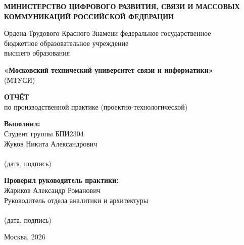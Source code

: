 \documentclass[12pt,a4paper]{report}
\begin{document}
\begin{titlepage}
\begin{center}

\textbf{МИНИСТЕРСТВО ЦИФРОВОГО РАЗВИТИЯ, СВЯЗИ И МАССОВЫХ КОММУНИКАЦИЙ РОССИЙСКОЙ ФЕДЕРАЦИИ}

\vspace{0.3em}

\parbox{0.9\textwidth}{\centering\small
Ордена Трудового Красного Знамени федеральное государственное \\
бюджетное образовательное учреждение \\
высшего образования
}

\vspace{0.3em}

\textbf{«Московский технический университет связи и информатики»} \\
(МТУСИ)

\vfill

\textbf{\Large ОТЧЁТ} \\
по производственной практике (проектно-технологической)

\vfill

\begin{flushright}
\begin{minipage}{0.55\textwidth}
\raggedleft
\setlength{\parskip}{0.3em}

\textbf{Выполнил:} \\
Студент группы БПИ2304 \\
Жуков Никита Александрович \\[0.5em]
\makebox[\linewidth]{\hrulefill} \\[0.3em]
(дата, подпись)

\vspace{1em}

\textbf{Проверил руководитель практики:} \\
Жариков Александр Романович \\
Руководитель отдела аналитики и архитектуры \\[0.5em]
\makebox[\linewidth]{\hrulefill} \\[0.3em]
(дата, подпись)
\end{minipage}
\end{flushright}

\vfill

\begin{center}
Москва, 2026
\end{center}

\end{center}
\end{titlepage}
\end{document}
